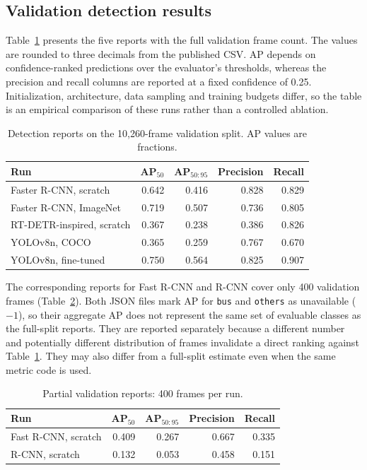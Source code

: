 \subsection{Validation detection results}
Table~\ref{tab:full} presents the five reports with the full validation frame count. The values are rounded to three decimals from the published CSV. AP depends on confidence-ranked predictions over the evaluator's thresholds, whereas the precision and recall columns are reported at a fixed confidence of 0.25. Initialization, architecture, data sampling and training budgets differ, so the table is an empirical comparison of these runs rather than a controlled ablation.

\begin{table}[htbp]
\centering
\caption{Detection reports on the 10,260-frame validation split. AP values are fractions.}
\label{tab:full}
\begin{tabular}{lrrrr}
\toprule
Run & AP$_{50}$ & AP$_{50:95}$ & Precision & Recall \\
\midrule
Faster R-CNN, scratch & 0.642 & 0.416 & 0.828 & 0.829 \\
Faster R-CNN, ImageNet & 0.719 & 0.507 & 0.736 & 0.805 \\
RT-DETR-inspired, scratch & 0.367 & 0.238 & 0.386 & 0.826 \\
YOLOv8n, COCO & 0.365 & 0.259 & 0.767 & 0.670 \\
YOLOv8n, fine-tuned & 0.750 & 0.564 & 0.825 & 0.907 \\
\bottomrule
\end{tabular}
\end{table}

The corresponding reports for Fast R-CNN and R-CNN cover only 400 validation frames (Table~\ref{tab:partial}). Both JSON files mark AP for \texttt{bus} and \texttt{others} as unavailable ($-1$), so their aggregate AP does not represent the same set of evaluable classes as the full-split reports. They are reported separately because a different number and potentially different distribution of frames invalidate a direct ranking against Table~\ref{tab:full}. They may also differ from a full-split estimate even when the same metric code is used.
\begin{table}[htbp]
\centering
\caption{Partial validation reports: 400 frames per run.}
\label{tab:partial}
\begin{tabular}{lrrrr}
\toprule
Run & AP$_{50}$ & AP$_{50:95}$ & Precision & Recall \\
\midrule
Fast R-CNN, scratch & 0.409 & 0.267 & 0.667 & 0.335 \\
R-CNN, scratch & 0.132 & 0.053 & 0.458 & 0.151 \\
\bottomrule
\end{tabular}
\end{table}

